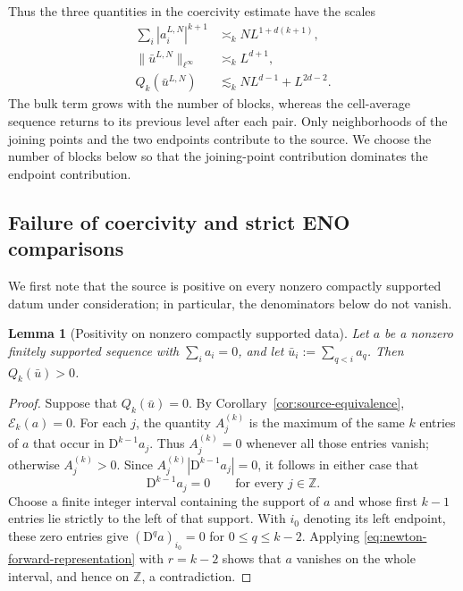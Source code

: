 \documentclass[11pt]{amsart}
\theoremstyle{plain}
\newtheorem{lemma}[theorem]{Lemma}
\theoremstyle{definition}
\theoremstyle{remark}
\numberwithin{equation}{section}
\theoremstyle{plain}
\begin{document}
Thus the three quantities in the coercivity estimate have the scales
\begin{equation}\label{eq:euler-three-scales}
	\begin{aligned}
		\sum_i|a_i^{L,N}|^{k+1}
		&\asymp_k NL^{1+d(k+1)},\\
		\|\bar u^{L,N}\|_{\ell^\infty}
		&\asymp_k L^{d+1},\\
		Q_k(\bar u^{L,N})
		&\lesssim_k NL^{d-1}+L^{2d-2}.
	\end{aligned}
\end{equation}
The bulk term grows with the number of blocks, whereas the cell-average
sequence returns to its previous level after each pair.  Only
neighborhoods of the joining points and the two endpoints contribute to
the source.  We choose the number of blocks below so that the
joining-point contribution dominates the endpoint contribution.

\subsection{Failure of coercivity and strict ENO comparisons}
\label{sec:even-robustness}

We first note that the source is positive on every nonzero compactly
supported datum under consideration; in particular, the denominators below do
not vanish.

\begin{lemma}[Positivity on nonzero compactly supported data]
	\label{lem:source-positivity}
	Let $a$ be a nonzero finitely supported sequence with $\sum_i a_i=0$, and
	let $\bar u_i:=\sum_{q<i}a_q$.  Then $Q_k(\bar u)>0$.
\end{lemma}

\begin{proof}
	Suppose that $Q_k(\bar u)=0$.  By
	Corollary~\ref{cor:source-equivalence}, $\mathcal E_k(a)=0$.  For each $j$,
	the quantity $A_j^{(k)}$ is the maximum of the same $k$ entries of $a$ that
	occur in $\mathrm D^{k-1}a_j$.  Thus
	$A_j^{(k)}=0$ whenever all those entries vanish; otherwise
	$A_j^{(k)}>0$.  Since
	$A_j^{(k)}|\mathrm D^{k-1}a_j|=0$, it follows in either case that
	\begin{equation}\label{eq:compact-kernel-vanishing}
		\mathrm D^{k-1}a_j=0
		\qquad\text{for every }j\in\mathbb Z.
	\end{equation}
	Choose a finite integer interval containing the support of $a$ and whose
	first $k-1$ entries lie strictly to the left of that support.  With $i_0$
	denoting its left endpoint, these zero entries give
	$(\mathrm D^qa)_{i_0}=0$ for $0\le q\le k-2$.  Applying
	\eqref{eq:newton-forward-representation} with $r=k-2$ shows that $a$ vanishes
	on the whole interval, and hence on $\mathbb Z$, a contradiction.
\end{proof}
\end{document}
